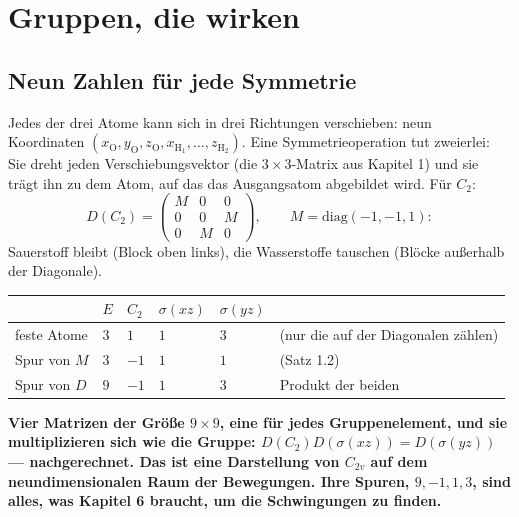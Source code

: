 \chapter{Gruppen, die wirken}

\section{Neun Zahlen für jede Symmetrie}

\begin{merksatz}
Jedes der drei Atome kann sich in drei Richtungen verschieben: neun Koordinaten $(x_{\mathrm O}, y_{\mathrm O}, z_{\mathrm O}, x_{\mathrm H_1}, \ldots, z_{\mathrm H_2})$. Eine Symmetrieoperation tut zweierlei: Sie dreht jeden Verschiebungsvektor (die $3\times3$-Matrix aus Kapitel 1) und sie trägt ihn zu dem Atom, auf das das Ausgangsatom abgebildet wird. Für $C_2$:
\[ D(C_2) = \begin{pmatrix} M & 0 & 0\\ 0 & 0 & M\\ 0 & M & 0\end{pmatrix}, \qquad M = \mathrm{diag}(-1, -1, 1) : \]
Sauerstoff bleibt (Block oben links), die Wasserstoffe tauschen (Blöcke außerhalb der Diagonale).

\begin{center}
{\small
\renewcommand{\arraystretch}{1.46}
\begin{tabular}{@{}P{1.6cm}P{1.0cm}P{1.0cm}P{1.4cm}P{1.4cm}P{2.4cm}@{}}
\toprule
 & $E$ & $C_2$ & $\sigma(xz)$ & $\sigma(yz)$ & \\
\midrule
feste Atome & $3$ & $1$ & $1$ & $3$ & (nur die auf der Diagonalen zählen)\\
Spur von $M$ & $3$ & $-1$ & $1$ & $1$ & (Satz 1.2)\\
Spur von $D$ & $9$ & $-1$ & $1$ & $3$ & Produkt der beiden\\
\bottomrule
\end{tabular}}
\end{center}

\begin{center}
\begin{minipage}{0.9\textwidth}
\textbf{Vier Matrizen der Größe $9\times9$, eine für jedes Gruppenelement, und sie multiplizieren sich wie die Gruppe: $D(C_2)D(\sigma(xz)) = D(\sigma(yz))$ --- nachgerechnet. Das ist eine Darstellung von $C_{2v}$ auf dem neundimensionalen Raum der Bewegungen. Ihre Spuren, $9, -1, 1, 3$, sind alles, was Kapitel 6 braucht, um die Schwingungen zu finden.}
\end{minipage}
\end{center}


\end{merksatz}
